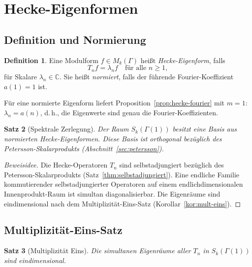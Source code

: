 \documentclass[12pt,a4paper]{amsart}
\newtheorem{theorem}{Satz}[section]
\theoremstyle{definition}
\newtheorem{definition}[theorem]{Definition}
\begin{document}
\section{Hecke-Eigenformen}

\subsection{Definition und Normierung}

\begin{definition}
  Eine Modulform $f \in M_k(\Gamma)$ hei{\ss}t \emph{Hecke-Eigenform}, falls
  \[
    T_n f = \lambda_n f \quad \text{f\"ur alle } n \ge 1,
  \]
  f\"ur Skalare $\lambda_n \in \mathbb{C}$. Sie hei{\ss}t \emph{normiert},
  falls der f\"uhrende Fourier-Koeffizient $a(1) = 1$ ist.
\end{definition}

F\"ur eine normierte Eigenform liefert Proposition~\ref{prop:hecke-fourier}
mit $m = 1$: $\lambda_n = a(n)$, d.\,h., die Eigenwerte sind genau die
Fourier-Koeffizienten.

\begin{theorem}[Spektrale Zerlegung]\label{thm:spektral}
  Der Raum $S_k(\Gamma(1))$ besitzt eine Basis aus normierten Hecke-Eigenformen.
  Diese Basis ist orthogonal bez\"uglich des Petersson-Skalarprodukts
  (Abschnitt~\ref{sec:petersson}).
\end{theorem}

\begin{proof}[Beweisidee]
  Die Hecke-Operatoren $T_n$ sind selbstadjungiert bez\"uglich des
  Petersson-Skalarprodukts (Satz~\ref{thm:selbstadjungiert}). Eine endliche
  Familie kommutierender selbstadjungierter Operatoren auf einem
  endlichdimensionalen Innenprodukt-Raum ist simultan diagonalisierbar.
  Die Eigenr\"aume sind eindimensional nach dem Multiplizit\"at-Eins-Satz
  (Korollar~\ref{kor:mult-eins}).
\end{proof}

\subsection{Multiplizit\"at-Eins-Satz}

\begin{theorem}[Multiplizit\"at Eins]\label{thm:mult-eins}
  Die simultanen Eigenr\"aume aller $T_n$ in $S_k(\Gamma(1))$ sind
  eindimensional.
\end{theorem}
\end{document}
